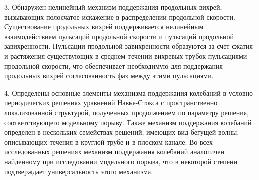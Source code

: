  $3.$  Обнаружен нелинейный механизм поддержания продольных вихрей, вызывающих полосчатое искажение в распределении продольной скорости. Существование продольных вихрей поддерживается нелинейным взаимодействием пульсаций продольной скорости и пульсаций продольной завихренности. Пульсации продольной завихренности образуются за счет сжатия и растяжения существующих в среднем течении вихревых трубок пульсациями продольной скорости, что обеспечивает необходимую для поддержания продольных вихрей согласованность фаз между этими пульсациями. 

 $4.$  Определены основные элементы механизма поддержания колебаний в ус\-лов\-но-периодических решениях уравнений Навье-Стокса с пространственно локализованной структурой, полученных продолжением по параметру решения, соответствующего модельному порыву. Также механизм поддержания колебаний определен в нескольких семействах решений, имеющих вид бегущей волны, описывающих течения в круглой трубе и в плоском канале. Во всех исследованных решениях механизм поддержания колебаний аналогичен найденному при исследовании модельного порыва, что в некоторой степени подтверждает универсальность этого механизма. 


